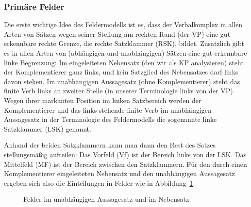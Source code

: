 
\subsubsection{Primäre Felder}


Die erste wichtige Idee des Feldermodells ist es, dass der Verbalkomplex in allen Arten von Sätzen wegen seiner Stellung am rechten Rand (der VP) eine gut erkennbare rechte Grenze, die rechte Satzklammer (RSK), bildet.
Zusätzlich gibt es in allen Arten von (abhängigen und unabhängigen) Sätzen eine gut erkennbare linke Begrenzung:
Im eingeleiteten Nebensatz (den wir als KP analysieren) steht der Komplementierer ganz links, und kein Satzglied des Nebensatzes darf links davon stehen.
Im unabhängigen Aussagesatz (ohne Komplementierer) steht das finite Verb links an zweiter Stelle (in unserer Terminologie links von der VP).
Wegen ihrer markanten Position im linken Satzbereich werden der Komplementierer und das links stehende finite Verb im unabhängigen Aussagesatz in der Terminologie des Feldermodells die sogenannte linke Satzklammer (LSK) genannt.

Anhand der beiden Satzklammern kann man dann den Rest des Satzes stellungsmäßig aufteilen:
Das Vorfeld (Vf) ist der Bereich links von der LSK.
Das Mittelfeld (MF) ist der Bereich zwischen den Satzklammern.
Für den durch einen Komplementierer eingeleiteten Nebensatz und den unabhängigen Aussagesatz ergeben sich also die Einteilungen in Felder wie in Abbildung~\ref{fig:felder1}.

\begin{figure}[h]
  \caption{Felder im unabhängigen Aussagesatz und im Nebensatz}
  \label{fig:felder1}
\end{figure}

